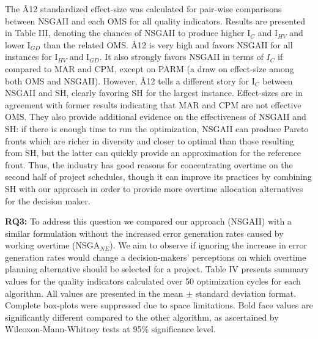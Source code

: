 \documentclass[conference]{IEEEtran}
\begin{document}
The {\^A12} standardized effect-size was calculated for pair-wise comparisons between NSGAII and each OMS for all quality indicators. Results are presented in Table III, denoting the chances of NSGAII to produce higher I$_C$ and I$_{HV}$ and lower I$_{GD}$ than the related OMS. {\^A}12 is very high and favors NSGAII for all instances for I$_{HV}$ and I$_{GD}$. It also strongly favors NSGAII in terms of $I_C$ if compared to MAR and CPM, except on PARM (a draw on effect-size among both OMS and NSGAII). However, {\^A}12 tells a different story for I$_{C}$ between NSGAII and SH, clearly favoring SH for the largest instance. Effect-sizes are in agreement with former results indicating that MAR and CPM are not effective OMS. They also provide additional evidence on the effectiveness of NSGAII and SH: if there is enough time to run the optimization, NSGAII can produce Pareto fronts which are richer in diversity and closer to optimal than those resulting from SH, but the latter can quickly provide an approximation for the reference front. Thus, the industry has good reasons for concentrating overtime on the second half of project schedules, though it can improve its practices by combining SH with our approach in order to provide more overtime allocation alternatives for the decision maker.

\vspace{3px}
\noindent
\textbf{RQ3:} To address this question we compared our approach (NSGAII) with a similar formulation without the increased error generation rates caused by working overtime (NSGA$_{NE}$). We aim to observe if ignoring the increase in error generation rates would change a decision-makers' perceptions on which overtime planning alternative should be selected for a project. Table IV presents summary values for the quality indicators calculated over 50 optimization cycles for each algorithm. All values are presented in the mean $\pm$ standard deviation format. Complete box-plots were suppressed due to space limitations. Bold face values are significantly different compared to the other algorithm, as ascertained by Wilcoxon-Mann-Whitney tests at 95\% significance level. 
\end{document}
